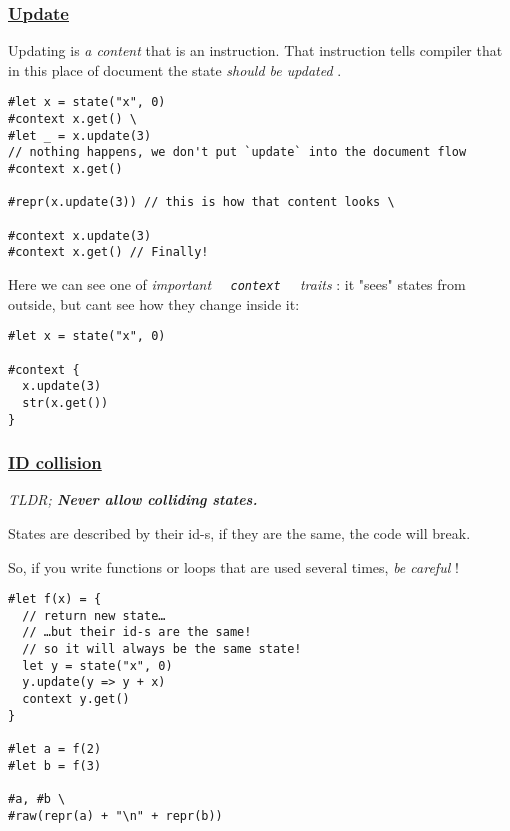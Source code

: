 \subsubsection{\texorpdfstring{\hyperref[update]{Update}}{Update}}\label{update}

Updating is \emph{a content} that is an instruction. That instruction
tells compiler that in this place of document the state \emph{should be
updated} .

\begin{verbatim}
#let x = state("x", 0)
#context x.get() \
#let _ = x.update(3)
// nothing happens, we don't put `update` into the document flow
#context x.get()

#repr(x.update(3)) // this is how that content looks \

#context x.update(3)
#context x.get() // Finally!
\end{verbatim}

\pandocbounded{}

Here we can see one of \emph{important
\texttt{\ }{\texttt{\ context\ }}\texttt{\ } traits} : it "sees" states
from outside, but can\textquotesingle t see how they change inside it:

\begin{verbatim}
#let x = state("x", 0)

#context {
  x.update(3)
  str(x.get())
}
\end{verbatim}

\pandocbounded{}

\subsubsection{\texorpdfstring{\hyperref[id-collision]{ID
collision}}{ID collision}}\label{id-collision}

\emph{TLDR; \textbf{Never allow colliding states.}}

States are described by their id-s, if they are the same, the code will
break.

So, if you write functions or loops that are used several times,
\emph{be careful} !

\begin{verbatim}
#let f(x) = {
  // return new state…
  // …but their id-s are the same!
  // so it will always be the same state!
  let y = state("x", 0)
  y.update(y => y + x)
  context y.get()
}

#let a = f(2)
#let b = f(3)

#a, #b \
#raw(repr(a) + "\n" + repr(b))
\end{verbatim}

